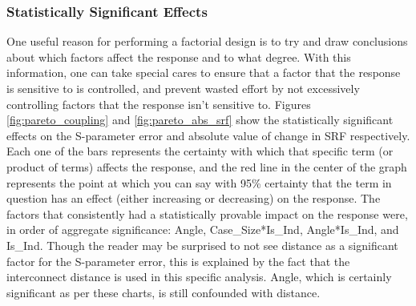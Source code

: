 \documentclass[12pt]{usfcoe}
\begin{document}


    

    \subsubsection{Statistically Significant Effects}
    One useful reason for performing a factorial design is to try and draw conclusions about which factors affect the response and to what degree. 
    With this information, one can take special cares to ensure that a factor that the response is sensitive to is controlled, and prevent wasted effort by not excessively controlling factors that the response isn't sensitive to.
    Figures \ref{fig:pareto_coupling}  and \ref{fig:pareto_abs_srf} show the statistically significant effects on the S-parameter error and absolute value of change in SRF  respectively.
    Each one of the bars represents the certainty with which that specific term (or product of terms) affects the response, and the red line in the center of the graph represents the point at which you can say with 95\% certainty that the term in question has an effect (either increasing or decreasing) on the response. 
    The factors that consistently had a statistically provable impact on the response were, in order of aggregate significance: Angle, Case\_Size*Is\_Ind, Angle*Is\_Ind, and Is\_Ind.
    Though the reader may be surprised to not see distance as a significant factor for the S-parameter error, this is explained by the fact that the interconnect distance is used in this specific analysis.
    Angle, which is certainly significant as per these charts, is still confounded with distance.
    
\end{document}
